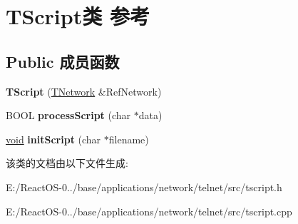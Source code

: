 \hypertarget{class_t_script}{}\section{T\+Script类 参考}
\label{class_t_script}
\subsection*{Public 成员函数}
\begin{DoxyCompactItemize}
\item 
\mbox{\label{class_t_script_a757c3572b37cee15adf56fd9bd6f3dae}} 
{\bfseries T\+Script} (\hyperlink{class_t_network}{T\+Network} \&Ref\+Network)
\item 
\mbox{\label{class_t_script_ae6dd84f73fcbb2eb91c918e23caef895}} 
B\+O\+OL {\bfseries process\+Script} (char $\ast$data)
\item 
\mbox{\label{class_t_script_a35445ad2b93f436a6b70d16158aaf49b}} 
\hyperlink{interfacevoid}{void} {\bfseries init\+Script} (char $\ast$filename)
\end{DoxyCompactItemize}


该类的文档由以下文件生成\+:\begin{DoxyCompactItemize}
\item 
E\+:/\+React\+O\+S-\/0../base/applications/network/telnet/src/tscript.\+h\item 
E\+:/\+React\+O\+S-\/0../base/applications/network/telnet/src/tscript.\+cpp\end{DoxyCompactItemize}
